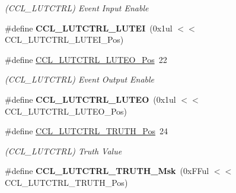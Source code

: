 \begin{DoxyCompactItemize}
\begin{DoxyCompactList}\small\item\em (C\+C\+L\+\_\+\+L\+U\+T\+C\+T\+R\+L) Event Input Enable \end{DoxyCompactList}\item 
\hypertarget{group___s_a_m_l21___c_c_l_ga4c7e6d992eecc1a1f9d6b8a06c8d9b20}{}\#define {\bfseries C\+C\+L\+\_\+\+L\+U\+T\+C\+T\+R\+L\+\_\+\+L\+U\+T\+E\+I}~(0x1ul $<$$<$ C\+C\+L\+\_\+\+L\+U\+T\+C\+T\+R\+L\+\_\+\+L\+U\+T\+E\+I\+\_\+\+Pos)\label{group___s_a_m_l21___c_c_l_ga4c7e6d992eecc1a1f9d6b8a06c8d9b20}

\item 
\hypertarget{group___s_a_m_l21___c_c_l_gadb614536601b4d78fde9d580188bc224}{}\#define \hyperlink{group___s_a_m_l21___c_c_l_gadb614536601b4d78fde9d580188bc224}{C\+C\+L\+\_\+\+L\+U\+T\+C\+T\+R\+L\+\_\+\+L\+U\+T\+E\+O\+\_\+\+Pos}~22\label{group___s_a_m_l21___c_c_l_gadb614536601b4d78fde9d580188bc224}

\begin{DoxyCompactList}\small\item\em (C\+C\+L\+\_\+\+L\+U\+T\+C\+T\+R\+L) Event Output Enable \end{DoxyCompactList}\item 
\hypertarget{group___s_a_m_l21___c_c_l_ga3543b4ccfa5317316d92c5449ae4632b}{}\#define {\bfseries C\+C\+L\+\_\+\+L\+U\+T\+C\+T\+R\+L\+\_\+\+L\+U\+T\+E\+O}~(0x1ul $<$$<$ C\+C\+L\+\_\+\+L\+U\+T\+C\+T\+R\+L\+\_\+\+L\+U\+T\+E\+O\+\_\+\+Pos)\label{group___s_a_m_l21___c_c_l_ga3543b4ccfa5317316d92c5449ae4632b}

\item 
\hypertarget{group___s_a_m_l21___c_c_l_gab080b12c5cb04cea57afcb7c38b7e7ba}{}\#define \hyperlink{group___s_a_m_l21___c_c_l_gab080b12c5cb04cea57afcb7c38b7e7ba}{C\+C\+L\+\_\+\+L\+U\+T\+C\+T\+R\+L\+\_\+\+T\+R\+U\+T\+H\+\_\+\+Pos}~24\label{group___s_a_m_l21___c_c_l_gab080b12c5cb04cea57afcb7c38b7e7ba}

\begin{DoxyCompactList}\small\item\em (C\+C\+L\+\_\+\+L\+U\+T\+C\+T\+R\+L) Truth Value \end{DoxyCompactList}\item 
\hypertarget{group___s_a_m_l21___c_c_l_ga721f265a6e25cdd1f2817a6ea1af4f9b}{}\#define {\bfseries C\+C\+L\+\_\+\+L\+U\+T\+C\+T\+R\+L\+\_\+\+T\+R\+U\+T\+H\+\_\+\+Msk}~(0x\+F\+Ful $<$$<$ C\+C\+L\+\_\+\+L\+U\+T\+C\+T\+R\+L\+\_\+\+T\+R\+U\+T\+H\+\_\+\+Pos)\label{group___s_a_m_l21___c_c_l_ga721f265a6e25cdd1f2817a6ea1af4f9b}


\end{DoxyCompactItemize}
